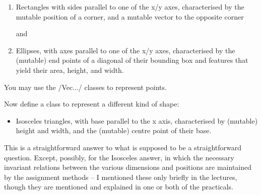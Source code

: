 \documentclass{ip3}
\begin{document}
\begin{foil}
\begin{exercise}
\begin{enumerate}
\item Rectangles with sides parallel to one of the x/y axes, characterised 
      by the mutable position of a corner, and a mutable vector to the opposite corner

and 

\item Ellipses, with axes parallel to one of the x/y axes, characterised by the (mutable) end points of a diagonal of
their bounding box and features that yield  their area, height, and width. 
\end{enumerate}
You may use the \sc/Vec.../ classes to represent points.

Now define a class to represent a different kind of shape: 
\begin{itemize}
\item Isosceles triangles, with base parallel to the x axis, characterised by  (mutable)
height and width, and the (mutable) centre point of their base.
\end{itemize}


\begin{answer}
This is a straightforward answer to what is supposed to be a straightforward question. Except, possibly,
for the Isosceles answer, in which the necessary invariant relations between the various dimensions and
positions are maintained by the assignment methods -- I mentioned these only
briefly in the lectures, though they are mentioned and explained in one or both of
the practicals. 
\end{answer}
\end{exercise}
\end{foil}
\end{document}
